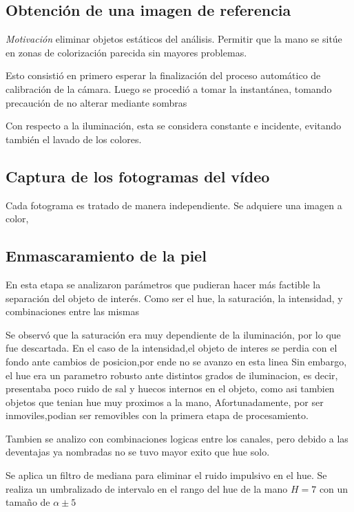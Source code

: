 \documentclass[conference,a4paper,10pt,oneside,final]{tfmpd}
\begin{document}
   	 \subsection{Obtención de una imagen de referencia}
   		 \emph{Motivación} eliminar objetos estáticos del análisis.
   		 Permitir que la mano se sitúe en zonas de colorización parecida
   		 sin mayores problemas.

   		 Esto consistió en primero esperar la finalización del proceso automático
   		 de calibración de la cámara. Luego se procedió a tomar la instantánea,
   		 tomando precaución de no alterar mediante sombras

   		 Con respecto a la iluminación, esta se considera constante e incidente,
   		 evitando también el lavado de los colores.

   	 \subsection{Captura de los fotogramas del vídeo}
   		 Cada fotograma es tratado de manera independiente.
   		 Se adquiere una imagen a color,

   	 \subsection{Enmascaramiento de la piel}
   		 En esta etapa se analizaron parámetros que pudieran hacer
   		 más factible la separación del objeto de interés.
   		 Como ser el hue, la saturación, la intensidad, y combinaciones entre las mismas
   		 
   		 Se observó que la saturación era muy dependiente de la iluminación, por lo que fue descartada.
   		 En el caso de la intensidad,el objeto de interes se perdia con el fondo ante cambios de posicion,por ende no se avanzo en esta linea
   		 Sin embargo, el hue era un parametro robusto ante distintos grados de iluminacion,
   		 es decir, presentaba poco ruido de sal y huecos internos en el objeto, como asi tambien objetos que tenian hue muy proximos a la mano,
   		 Afortunadamente, por ser inmoviles,podian ser removibles con la primera etapa de procesamiento.
   		 
   		 Tambien se analizo con combinaciones logicas entre los canales, pero debido a las deventajas ya nombradas
   		 no se tuvo mayor exito que hue solo.

   		 Se aplica un filtro de mediana para eliminar el ruido impulsivo en el hue.
   		 Se realiza un umbralizado de intervalo en el rango del hue de la mano $H=7$ con un tamaño de $\alpha \pm 5$
\end{document}
